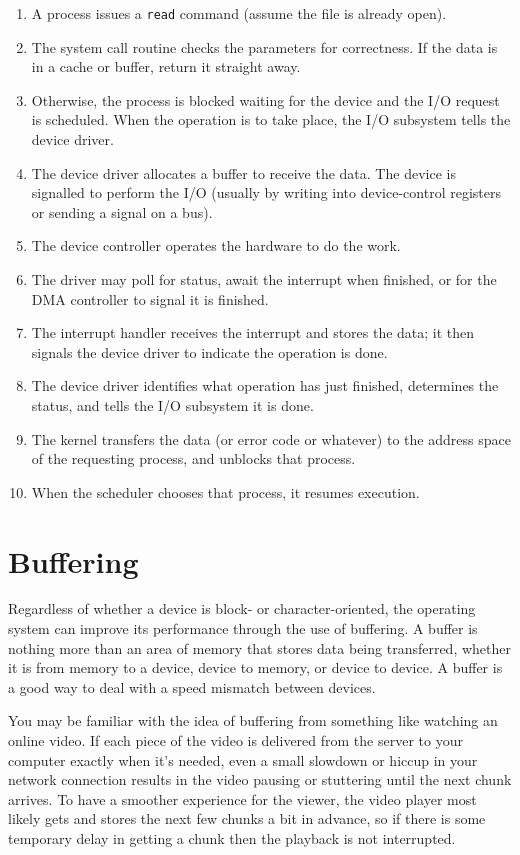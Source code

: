 \begin{enumerate}
	\item A process issues a \texttt{read} command (assume the file is already open).
	\item The system call routine checks the parameters for correctness. If the data is in a cache or buffer, return it straight away.
	\item Otherwise, the process is blocked waiting for the device and the I/O request is scheduled. When the operation is to take place, the I/O subsystem tells the device driver.
	\item The device driver allocates a buffer to receive the data. The device is signalled to perform the I/O (usually by writing into device-control registers or sending a signal on a bus).
	\item The device controller operates the hardware to do the work.
	\item The driver may poll for status, await the interrupt when finished, or for the DMA controller to signal it is finished.
	\item The interrupt handler receives the interrupt and stores the data; it then signals the device driver to indicate the operation is done.
	\item The device driver identifies what operation has just finished, determines the status, and tells the I/O subsystem it is done.
	\item The kernel transfers the data (or error code or whatever) to the address space of the requesting process, and unblocks that process.
	\item When the scheduler chooses that process, it resumes execution.
\end{enumerate}

\section*{Buffering}

Regardless of whether a device is block- or character-oriented, the operating system can improve its performance through the use of buffering. A buffer is nothing more than an area of memory that stores data being transferred, whether it is from memory to a device, device to memory, or device to device.  A buffer is a good way to deal with a speed mismatch between devices.

You may be familiar with the idea of buffering from something like watching an online video. If each piece of the video is delivered from the server to your computer exactly when it's needed, even a small slowdown or hiccup in your network connection results in the video pausing or stuttering until the next chunk arrives. To have a smoother experience for the viewer, the video player most likely gets and stores the next few chunks a bit in advance, so if there is some temporary delay in getting a chunk then the playback is not interrupted.

